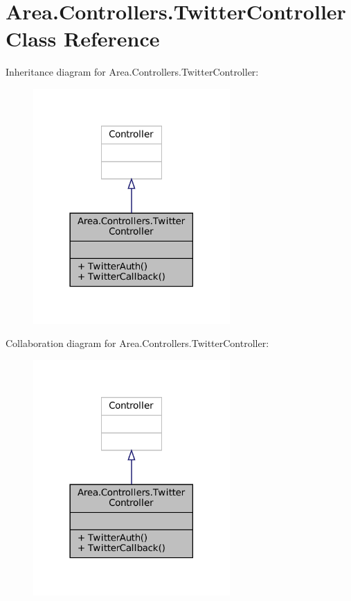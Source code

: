 \hypertarget{classArea_1_1Controllers_1_1TwitterController}{}\section{Area.\+Controllers.\+Twitter\+Controller Class Reference}
\label{classArea_1_1Controllers_1_1TwitterController}


Inheritance diagram for Area.\+Controllers.\+Twitter\+Controller\+:
\nopagebreak
\begin{figure}[H]
\begin{center}
\leavevmode
\includegraphics[width=213pt]{classArea_1_1Controllers_1_1TwitterController__inherit__graph}
\end{center}
\end{figure}


Collaboration diagram for Area.\+Controllers.\+Twitter\+Controller\+:
\nopagebreak
\begin{figure}[H]
\begin{center}
\leavevmode
\includegraphics[width=213pt]{classArea_1_1Controllers_1_1TwitterController__coll__graph}
\end{center}
\end{figure}
